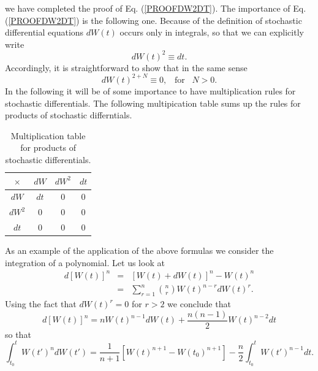 we have completed the proof of Eq. (\ref{PROOFDW2DT}).
The importance of Eq. (\ref{PROOFDW2DT}) is the following one. Because
of the definition of stochastic differential equations $dW(t)$
occurs only in integrals, so that we can explicitly write
\begin{equation*}
dW(t)^2 \equiv dt.
\end{equation*}
Accordingly, it is straightforward to show that in the same sense
\begin{equation*}
dW(t)^{2+N} \equiv 0, \;\;\; \text{for} \;\;\; N>0.
\end{equation*}
In the following it will be of some importance to have 
multiplication rules for stochastic differentials. The following
multipication table sums up the rules for products of stochastic 
differntials.
\begin{table}
\caption{Multiplication table for products of stochastic differentials.}
\begin{center}
\begin{tabular}{|c||c|c|c|}\hline 
$\times$ & $dW$ & $dW^2$ & $dt$ \\ \hline \hline
$dW$     & $dt$ & $0$    & $0$   \\ \hline
$dW^2$   &  $0$ & $0$    &  $0$  \\ \hline
$dt$     &  $0$ & $0$    & $0$  \\ \hline
\end{tabular}
\end{center}
\end{table}
As an example of the application of the above formulas we consider the
integration of a polynomial. Let us look at
\begin{eqnarray*}
d[W(t)]^n & = & [W(t) + dW(t)]^n - W(t)^n \\
          & = & \sum_{r=1}^n \binom{n}{r} W(t)^{n-r} dW(t)^r .
\end{eqnarray*}
Using the fact that $dW(t)^r = 0$ for $r>2$ we conclude that
\begin{equation*}
d[W(t)]^n = n W(t)^{n-1}dW(t) +
\frac{n(n-1)}{2} W(t)^{n-2} dt
\end{equation*}
so that
\begin{equation*}
\int_{t_0}^t W(t')^n dW(t') = \frac{1}{n+1}  [W(t)^{n+1} - W(t_0)^{n+1}]
   -\frac{n}{2} \int_{t_0}^t W(t')^{n-1} dt.
\end{equation*}



